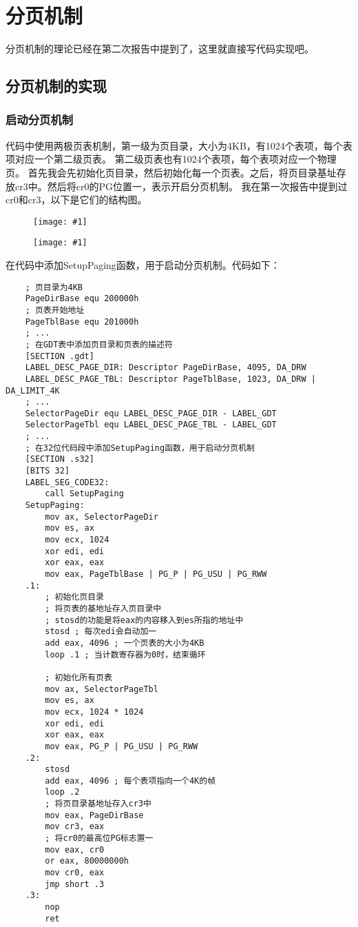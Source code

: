 \documentclass[a4paper,left=2.5cm,right=2.5cm,11pt]{article}
\newcommand{\fic}[1]{\begin{figure}[H]
		\center
		\texttt{[image: \#1]}
	\end{figure}}
\begin{document}
\tableofcontents

\clearpage

\section{分页机制}
	分页机制的理论已经在第二次报告中提到了，这里就直接写代码实现吧。
\subsection{分页机制的实现}
\subsubsection{启动分页机制}
	代码中使用两极页表机制，第一级为页目录，大小为4KB，有1024个表项，每个表项对应一个第二级页表。
	第二级页表也有1024个表项，每个表项对应一个物理页。
	首先我会先初始化页目录，然后初始化每一个页表。之后，将页目录基址存放cr3中。然后将cr0的PG位置一，表示开启分页机制。
	我在第一次报告中提到过cr0和cr3，以下是它们的结构图。
	\fic{4.png}
	\fic{5.png}

	在代码中添加SetupPaging函数，用于启动分页机制。代码如下：
	\begin{lstlisting}
	; 页目录为4KB
	PageDirBase equ 200000h
	; 页表开始地址
	PageTblBase equ 201000h
	; ...
	; 在GDT表中添加页目录和页表的描述符
	[SECTION .gdt]
	LABEL_DESC_PAGE_DIR: Descriptor PageDirBase, 4095, DA_DRW
	LABEL_DESC_PAGE_TBL: Descriptor PageTblBase, 1023, DA_DRW | DA_LIMIT_4K
	; ...
	SelectorPageDir equ LABEL_DESC_PAGE_DIR - LABEL_GDT
	SelectorPageTbl equ LABEL_DESC_PAGE_TBL - LABEL_GDT
	; ...
	; 在32位代码段中添加SetupPaging函数，用于启动分页机制
	[SECTION .s32]
	[BITS 32]
	LABEL_SEG_CODE32:
		call SetupPaging
	SetupPaging:
		mov ax, SelectorPageDir
		mov es, ax
		mov ecx, 1024
		xor edi, edi
		xor eax, eax
		mov eax, PageTblBase | PG_P | PG_USU | PG_RWW
	.1:
		; 初始化页目录
		; 将页表的基地址存入页目录中
		; stosd的功能是将eax的内容移入到es所指的地址中
		stosd ; 每次edi会自动加一
		add eax, 4096 ; 一个页表的大小为4KB
		loop .1 ; 当计数寄存器为0时，结束循环

		; 初始化所有页表
		mov ax, SelectorPageTbl
		mov es, ax
		mov ecx, 1024 * 1024
		xor edi, edi
		xor eax, eax
		mov eax, PG_P | PG_USU | PG_RWW
	.2:
		stosd
		add eax, 4096 ; 每个表项指向一个4K的帧
		loop .2
		; 将页目录基地址存入cr3中
		mov eax, PageDirBase
		mov cr3, eax
		; 将cr0的最高位PG标志置一
		mov eax, cr0
		or eax, 80000000h
		mov cr0, eax
		jmp short .3
	.3:
		nop
		ret
	\end{lstlisting}
\end{document}
